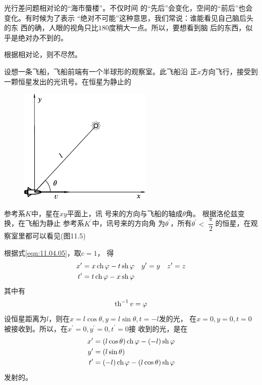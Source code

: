 \example 光行差问题相对论的“海市蜃楼”。不仅时间
的“先后”会变化，空间的“前后”也会变化。有时候为了表示
“绝对不可能”这种意思，我们常说：谁能看见自己脑后头的东
西的确，人眼的视角只比$ 180 $度稍大一点。所以，要想看到脑
后的东西，似乎是绝对办不到的。

根据相对论，则不尽然。

设想一条飞船，飞船前端有一个半球形的观察室。此飞船沿
正$ x $方向飞行，接受到一颗恒星发出的光讯号。在恒星为静止的

\clearpage\noindent
\begin{figure}
  \centering
  \includegraphics{figure/fig11.05}
  \caption{}
  \label{fig:11.05}
\end{figure}
参考系$ K $中，星在$ xy $平面上，讯
号来的方向与飞船的轴成$ \theta $角。
根据洛伦兹变换，在飞船为静止
参考系$ K ^ { \prime }$中，讯号来的方向角
为$ \theta ^ { \prime } $，所有$ \theta ^ { \prime } < \dfrac { \uppi } { 2 } $的恒星，在观
察室里都可以看见(图11.5)

根据式\eqref{eqn:11.04.05}，取$ c = 1 $，
得
\begin{align*}
  x ^ { \prime } & = x \operatorname{ch} \varphi - t \operatorname{sh} \varphi
  \quad y ^ { \prime } = y \quad z ^ { \prime } = z \\
  t ^ { \prime } & = t \operatorname{ch} \varphi - x \operatorname{sh} \varphi
\end{align*}
其中有
\begin{equation*}
  \operatorname{th} ^ { - 1 } v = \varphi
\end{equation*}
设恒星距离为$ l $，则在$ x = l \cos \theta , y = l \sin \theta , t = - l $发的光，
在$ x = 0 , y = 0 , t = 0 $被接收到。所以，在$ x ^ { \prime } = 0 , y ^ { \prime } = 0 , t ^ { \prime } = 0 $接
收到的光，是在
\begin{align*}
  x ^ { \prime } & = \left( l \cos \theta \right) \operatorname{ch} \varphi - \left( - l \right) \operatorname{sh} \varphi \\
  y ^ { \prime } & = \left( l \sin \theta \right)                                              \\
  t ^ { \prime } & = \left( - l \right) \operatorname{ch} \varphi - \left( l \cos \theta \right) \operatorname{sh} \varphi
\end{align*}
发射的。

